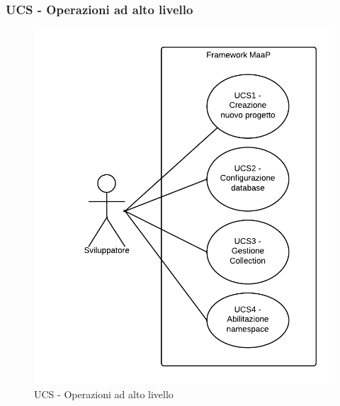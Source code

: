 \subsubsection{UCS - Operazioni ad alto livello} 
    \begin{figure}[H]
      \begin{center}
      \includegraphics[scale=0.16]{UML/UCS - Operazioni ad alto livello.png}
      \caption{UCS - Operazioni ad alto livello}
      \end{center} 
    \end{figure}  
    
